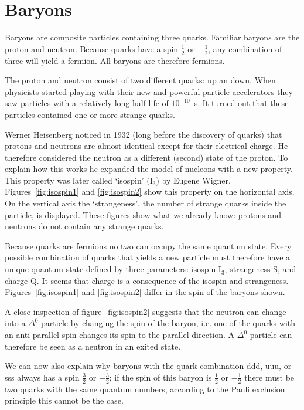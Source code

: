 \section{Baryons}
Baryons are composite particles containing three quarks. Familiar baryons are the proton and neutron. Because quarks have a spin $\frac{1}{2}$ or $-\frac{1}{2}$, any combination of three will yield a fermion. All baryons are therefore fermions.

The proton and neutron consist of two different quarks: up an down. When physicists started playing with their new and powerful particle accelerators they saw particles with a relatively long half-life of $10^{-10}$~s. It turned out that these particles contained one or more strange-quarks.

Werner Heisenberg noticed in 1932 (long before the discovery of quarks) that protons and neutrons are almost identical except for their electrical charge. He therefore considered the neutron as a different (second) state of the proton. To explain how this works he expanded the model of nucleons with a new property. This property was later called `isospin' (I$_3$) by Eugene Wigner. Figures~\ref{fig:isospin1} and \ref{fig:isospin2} show this property on the horizontal axis. On the vertical axis the `strangeness', the number of strange quarks inside the particle, is displayed. These figures show what we already know: protons and neutrons do not contain any strange quarks.

Because quarks are fermions no two can occupy the same quantum state. Every possible combination of quarks that yields a new particle must therefore have a unique quantum state defined by three parameters: isospin I$_3$, strangeness S, and charge Q. It seems that charge is a consequence of the isospin and strangeness. Figures~\ref{fig:isospin1} and \ref{fig:isospin2} differ in the spin of the baryons shown.

A close inspection of figure~\ref{fig:isospin2} suggests that the neutron can change into a $\Delta^0$-particle by changing the spin of the baryon, i.e. one of the quarks with an anti-parallel spin changes its spin to the parallel direction. A $\Delta^0$-particle can therefore be seen as a neutron in an exited state.

We can now also explain why baryons with the quark combination ddd, uuu, or sss always has a spin $\frac{3}{2}$ or $-\frac{3}{2}$; if the spin of this baryon is $\frac{1}{2}$ or $-\frac{1}{2}$ there must be two quarks with the same quantum numbers, according to the Pauli exclusion principle this cannot be the case.


